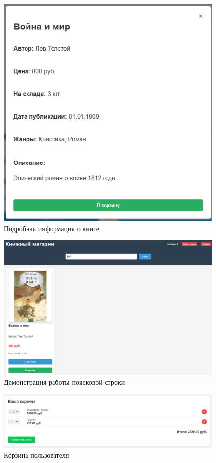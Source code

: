 \begin{figure}[H]
	\centering
	\includegraphics[width=0.7\linewidth]{images/подробнее}
	\caption{Подробная информация о книге}
	\label{fig:}
\end{figure}


\begin{figure}[H]
	\centering
	\includegraphics[width=0.7\linewidth]{images/Screenshot_5}
	\caption{Демонстрация работы поисковой строки}
	\label{fig:screenshot5}
\end{figure}

\begin{figure}[H]
	\centering
	\includegraphics[width=0.7\linewidth]{images/корзинка}
	\caption{Корзина пользователя}
	\label{fig:}
\end{figure}

